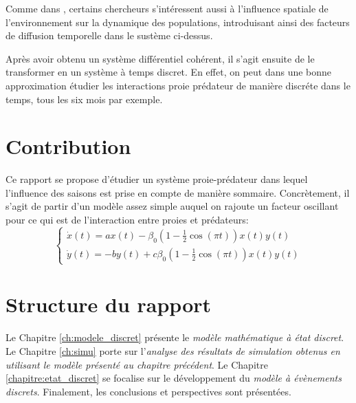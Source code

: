 Comme dans \cite{ProtecZone}, certains chercheurs s'intéressent aussi à l'influence spatiale de l'environnement sur la dynamique des populations, introduisant ainsi des facteurs de diffusion temporelle dans le sustème ci-dessus.

Après avoir obtenu un système différentiel cohérent, il s'agit ensuite de le transformer en un système à temps discret. En effet, on peut dans une bonne approximation étudier les interactions proie prédateur de manière discréte dans le temps, tous les six mois par exemple.

\section{Contribution}
\label{sec:Contribution}

Ce rapport se propose d'étudier un système proie-prédateur dans lequel l'influence des saisons est prise en compte de manière sommaire.
Concrètement, il s'agit de partir d'un modèle assez simple auquel on rajoute un facteur oscillant pour ce qui est de l'interaction entre proies et prédateurs: 
\begin{equation}
    \label{eq:syst_continu}
    \begin{cases}
        \dot{x}(t) = a x(t) - \beta_0 ( 1 - \frac{1}{2} \cos(\pi t)) x(t) y(t) \\
        \dot{y}(t) = -b y(t) + c \beta_0 ( 1 - \frac{1}{2} \cos(\pi t)) x(t) y(t)
    \end{cases}
\end{equation}

\section{Structure du rapport}
\label{sec:Structure}

Le Chapitre \ref{ch:modele_discret} présente le \textit{modèle mathématique à état discret}. Le Chapitre \ref{ch:simu} porte sur l’\textit{analyse des résultats de simulation obtenus en utilisant le modèle présenté au chapitre précédent}. Le Chapitre \ref{chapitre:etat_discret} se focalise sur le développement du \textit{modèle à évènements discrets}. Finalement, les conclusions et perspectives sont présentées.
